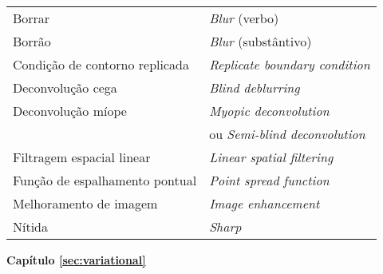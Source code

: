 \begin{table}[H]
\begin{center}
\begin{tabular}{ l l }
Borrar & \textit{Blur} (verbo) \\
Borrão & \textit{Blur} (substântivo) \\
Condição de contorno replicada & \textit{Replicate boundary condition} \\
Deconvolução cega & \textit{Blind deblurring}\\
Deconvolução míope & \textit{Myopic deconvolution}\\
 & \quad ou \textit{Semi-blind deconvolution} \\
Filtragem espacial linear & \textit{Linear spatial filtering}\\
Função de espalhamento pontual & \textit{Point spread function}\\
Melhoramento de imagem & \textit{Image enhancement}\\
Nítida & \textit{Sharp}\\
\end{tabular}
\end{center}
\end{table}


\newpage
\begin{center}
\textbf{Capítulo \ref{sec:variational}}
\end{center}

